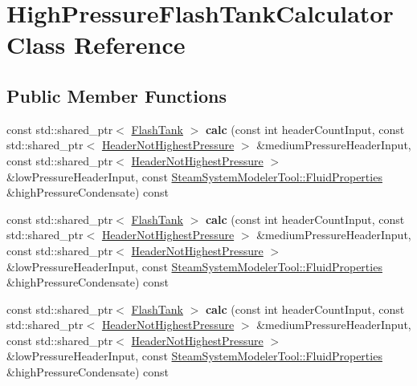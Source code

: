 \hypertarget{class_high_pressure_flash_tank_calculator}{}\section{High\+Pressure\+Flash\+Tank\+Calculator Class Reference}
\label{class_high_pressure_flash_tank_calculator}
\subsection*{Public Member Functions}
\begin{DoxyCompactItemize}
\item 
\mbox{\label{class_high_pressure_flash_tank_calculator_adde775ba652bf458a52f1604618cb26f}} 
const std\+::shared\+\_\+ptr$<$ \hyperlink{class_flash_tank}{Flash\+Tank} $>$ {\bfseries calc} (const int header\+Count\+Input, const std\+::shared\+\_\+ptr$<$ \hyperlink{class_header_not_highest_pressure}{Header\+Not\+Highest\+Pressure} $>$ \&medium\+Pressure\+Header\+Input, const std\+::shared\+\_\+ptr$<$ \hyperlink{class_header_not_highest_pressure}{Header\+Not\+Highest\+Pressure} $>$ \&low\+Pressure\+Header\+Input, const \hyperlink{struct_steam_system_modeler_tool_1_1_fluid_properties}{Steam\+System\+Modeler\+Tool\+::\+Fluid\+Properties} \&high\+Pressure\+Condensate) const
\item 
\mbox{\label{class_high_pressure_flash_tank_calculator_a713ac46b852539c9bf91f1e9039d4f60}} 
const std\+::shared\+\_\+ptr$<$ \hyperlink{class_flash_tank}{Flash\+Tank} $>$ {\bfseries calc} (const int header\+Count\+Input, const std\+::shared\+\_\+ptr$<$ \hyperlink{class_header_not_highest_pressure}{Header\+Not\+Highest\+Pressure} $>$ \&medium\+Pressure\+Header\+Input, const std\+::shared\+\_\+ptr$<$ \hyperlink{class_header_not_highest_pressure}{Header\+Not\+Highest\+Pressure} $>$ \&low\+Pressure\+Header\+Input, const \hyperlink{struct_steam_system_modeler_tool_1_1_fluid_properties}{Steam\+System\+Modeler\+Tool\+::\+Fluid\+Properties} \&high\+Pressure\+Condensate) const
\item 
\mbox{\label{class_high_pressure_flash_tank_calculator_a713ac46b852539c9bf91f1e9039d4f60}} 
const std\+::shared\+\_\+ptr$<$ \hyperlink{class_flash_tank}{Flash\+Tank} $>$ {\bfseries calc} (const int header\+Count\+Input, const std\+::shared\+\_\+ptr$<$ \hyperlink{class_header_not_highest_pressure}{Header\+Not\+Highest\+Pressure} $>$ \&medium\+Pressure\+Header\+Input, const std\+::shared\+\_\+ptr$<$ \hyperlink{class_header_not_highest_pressure}{Header\+Not\+Highest\+Pressure} $>$ \&low\+Pressure\+Header\+Input, const \hyperlink{struct_steam_system_modeler_tool_1_1_fluid_properties}{Steam\+System\+Modeler\+Tool\+::\+Fluid\+Properties} \&high\+Pressure\+Condensate) const
\end{DoxyCompactItemize}


